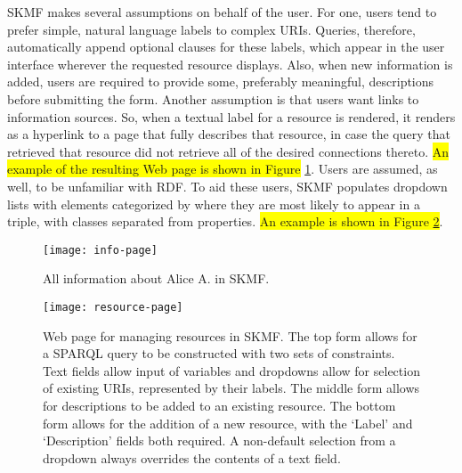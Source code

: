SKMF makes several assumptions on behalf of the user. For one, users tend to prefer simple, natural language labels to complex URIs. Queries, therefore, automatically append optional clauses for these labels, which appear in the user interface wherever the requested resource displays. Also, when new information is added, users are required to provide some, preferably meaningful, descriptions before submitting the form. Another assumption is that users want links to information sources. So, when a textual label for a resource is rendered, it renders as a hyperlink to a page that fully describes that resource, in case the query that retrieved that resource did not retrieve all of the desired connections thereto.
\colorbox{yellow}{An example of the resulting Web page is shown in Figure}
\ref{info-page}.
Users are assumed, as well, to be unfamiliar with RDF. To aid these users, SKMF populates dropdown lists with elements categorized by where they are most likely to appear in a triple, with classes separated from properties.
\colorbox{yellow}{An example is shown in Figure \ref{resource-page}}.

\begin{figure}[!ht]
\texttt{[image: info-page]}
\caption[Resource information page of SKMF]
 {\narrower All information about Alice A. in SKMF.
 }
\label{info-page}
\end{figure}

\begin{figure}[!ht]
\texttt{[image: resource-page]}
\caption[Resource management page of SKMF]
 {\narrower Web page for managing resources in SKMF. The top form allows for a SPARQL query to be constructed with two sets of constraints. Text fields allow input of variables and dropdowns allow for selection of existing URIs, represented by their labels. The middle form allows for descriptions to be added to an existing resource. The bottom form allows for the addition of a new resource, with the `Label' and `Description' fields both required. A non-default selection from a dropdown always overrides the contents of a text field.
 }
\label{resource-page}
\end{figure}


